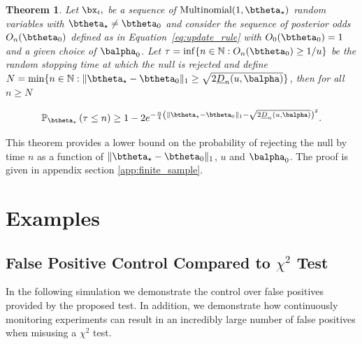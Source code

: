 \documentclass[11pt]{article}
\newtheorem{thm}{Theorem}[section]
\begin{document}
\begin{thm}
  \label{thm:finite_sample}
\noindent Let $\bx_i,$ be a sequence of $\text{Multinomial}(1,\btheta_{\star})$ random variables with $\btheta_{\star} \neq \btheta_0$ and consider the sequence of posterior odds $O_n(\btheta_0)$ defined as in Equation~\ref{eq:update_rule} with $O_0(\btheta_0)=1$ and a given choice of $\balpha_0$.
Let $\tau = \inf \lbrace n \in \mathbb{N}: O_n(\btheta_0) \geq 1/u \rbrace$ be the random stopping time at which the null is rejected and define $N = \min \{n \in \mathbb{N} : \|\btheta_\star - \btheta_0\|_1 \geq \sqrt{2\underline{D}_n(u,\balpha)}\}$, then for all $n\geq N$

\begin{equation}
  \label{eq:finite_sample}
\mathbb{P}_{\btheta_{\star}}\left( \tau \leq  n \right) \geq
 1 -2e^{-\frac{n}{4}\left(\|\btheta_\star - \btheta_0\|_1-\sqrt{2\underline{D}_n(u,\balpha)}\right)^2}.
\end{equation}
\end{thm}
\noindent This theorem provides a lower bound on the probability of rejecting the null by time $n$ as a function of $\|\btheta_\star - \btheta_0\|_1$, $u$ and $\balpha_0$.
The proof is given in appendix section \ref{app:finite_sample}. 

\section{Examples}
\label{sec:simulation}
  \subsection{False Positive Control Compared to $\chi^2$ Test}
  In the following simulation we demonstrate the control over false positives provided by the proposed test.
  In addition, we demonstrate how continuously monitoring experiments can result in an incredibly large number of false positives when misusing a $\chi^2$ test.
\end{document}
